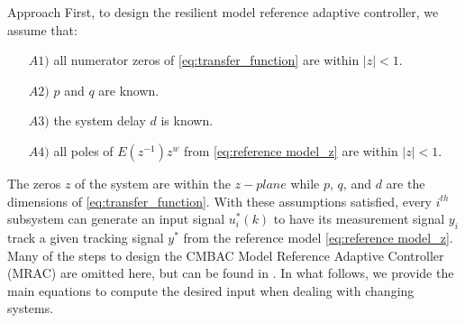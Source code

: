 \begin{section}{Approach}
First, to design the resilient model reference adaptive controller, we assume that:
	\begin{enumerate}%
	\item[$A1)$] all numerator zeros of \eqref{eq:transfer_function} are within $|z|<1$.
	\item[$A2)$] $p$ and $q$ are known. 
	\item[$A3)$] the system delay $d$ is known.
	\item[$A4)$] all poles of $E(z^{-1})z^w$ from \eqref{eq:reference model_z} are within $|z|<1$.
	\end{enumerate}
The zeros $z$ of the system are within the $z-plane$ while $p$, $q$, and $d$ are the dimensions of \eqref{eq:transfer_function}. With these assumptions satisfied, every $i^{th}$ subsystem can generate an input signal $u^*_i(k)$ to have its measurement signal $y_i$ track a given tracking signal $y^*$ from the reference model \eqref{eq:reference model_z}. Many of the steps to design the CMBAC Model Reference Adaptive Controller (MRAC) are omitted here, but can be found in \cite{tao2003adaptive}. In what follows, we provide the main equations to compute the desired input when dealing with changing systems. 

\end{section}
